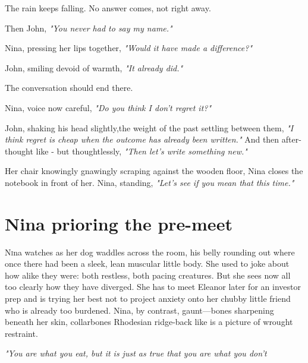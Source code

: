 \smallskip

The rain keeps falling. No answer comes, not right away.  

\smallskip

Then John, \textit{"You never had to say my name."}  

\smallskip

Nina, pressing her lips together, \textit{"Would it have made a difference?"}  
\smallskip

John, smiling devoid of warmth, \textit{"It already did."}  

\smallskip

The conversation should end there.  

\smallskip

Nina, voice now careful, \textit{"Do you think I don’t regret it?"}  

\smallskip

\noindent
John, shaking his head slightly,the weight of the past settling between them, \textit{"I think regret is cheap when the outcome has already been written."} And then after-thought like - but thoughtlessly, \textit{"Then let’s write something new."}  

\smallskip

\noindent
Her chair knowingly gnawingly scraping against the wooden floor, Nina closes the notebook in front of her.  Nina, standing, \textit{"Let’s see if you mean that this time."}  

\newpage

\section*{Nina prioring the pre-meet}

\lettrine{N}ina watches as her dog waddles across the room, his belly rounding out where once there had been a sleek, lean muscular little body. She used to joke about how alike they were: both restless, both pacing creatures. But she sees now all too clearly how they have diverged. She has to meet Eleanor later for an investor prep and is trying her best not to project anxiety onto her chubby little friend who is already too burdened. Nina, by contrast, gaunt—bones sharpening beneath her skin, collarbones Rhodesian ridge-back like is a picture of wrought restraint.

\smallskip

\textit{"You are what you eat, but it is just as true that you are what you don’t} 

\smallskip

